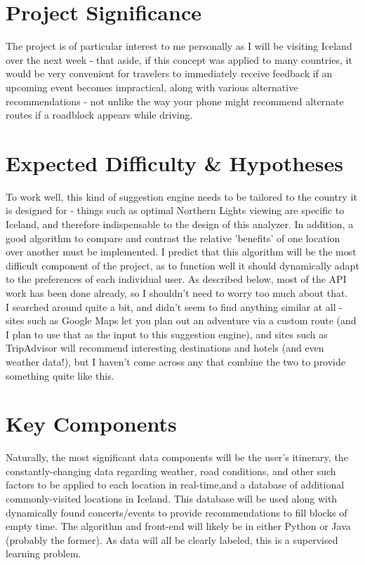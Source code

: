\documentclass[9pt]{article}
\begin{document}
\section{Project Significance}
The project is of particular interest to me personally as I will be visiting Iceland over the next week - that aside, if this concept was applied to many countries, it would be very convenient for travelers to immediately receive feedback if an upcoming event becomes impractical, along with various alternative recommendations - not unlike the way your phone might recommend alternate routes if a roadblock appears while driving.

\section{Expected Difficulty \& Hypotheses}
To work well, this kind of suggestion engine needs to be tailored to the country it is designed for - things such as optimal Northern Lights viewing are specific to Iceland, and therefore indispensable to the design of this analyzer. In addition, a good algorithm to compare and contrast the relative 'benefits' of one location over another must be implemented. I predict that this algorithm will be the most difficult component of the project, as to function well it should dynamically adapt to the preferences of each individual user. As described below, most of the API work has been done already, so I shouldn't need to worry too much about that.\\

I searched around quite a bit, and didn't seem to find anything similar at all - sites such as Google Maps let you plan out an adventure via a custom route (and I plan to use that as the input to this suggestion engine), and sites such as TripAdvisor will recommend interesting destinations and hotels (and even weather data!), but I haven't come across any that combine the two to provide something quite like this.

\section{Key Components}
Naturally, the most significant data components will be the user's itinerary, the constantly-changing data regarding weather, road conditions, and other such factors to be applied to each location in real-time,and a database of additional commonly-visited locations in Iceland. This database will be used along with dynamically found concerts/events to provide recommendations to fill blocks of empty time. The algorithm and front-end will likely be in either Python or Java (probably the former). As data will all be clearly labeled, this is a supervised learning problem.
\end{document}
